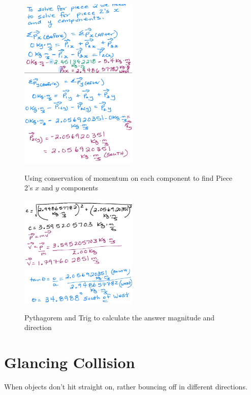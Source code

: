 \documentclass[a4paper,12pt]{article}
\begin{document}
\pagebreak
\begin{figure}[H]
    \centering
    \caption{Using conservation of momentum on each component to find Piece 2's $x$ and $y$ components}
    \includegraphics[width=0.50\textwidth]{q-explode-4d}
    \includegraphics[width=0.50\textwidth]{q-explode-4e}
\end{figure}

\begin{figure}[H]
    \centering
    \caption{Pythagorem and Trig to calculate the answer magnitude and direction}
    \includegraphics[width=0.50\textwidth]{q-explode-4f}
    \includegraphics[width=0.50\textwidth]{q-explode-4g}
\end{figure}

\pagebreak
\section{Glancing Collision}
When objects don't hit straight on, rather bouncing off in different directions.
\end{document}
